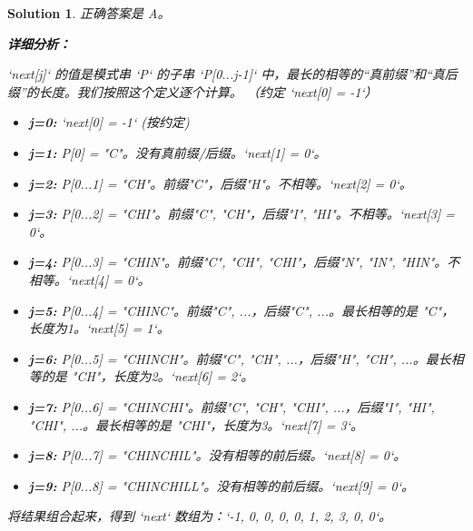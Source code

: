 \documentclass[UTF8]{report}
\newtheorem{solution}{Solution}
\theoremstyle{MyLineTheoremStyle} %
\theoremstyle{MyBlockTheoremStyle} %
\theoremstyle{MySubsubsectionStyle} %
\begin{document}
\begin{solution}
正确答案是 A。

\textbf{详细分析：}

`next[j]` 的值是模式串 `P` 的子串 `P[0...j-1]` 中，最长的相等的“真前缀”和“真后缀”的长度。我们按照这个定义逐个计算。
（约定 `next[0] = -1`）

\begin{itemize}
    \item \textbf{j=0:} `next[0] = -1` (按约定)
    \item \textbf{j=1:} P[0] = "C"。没有真前缀/后缀。`next[1] = 0`。
    \item \textbf{j=2:} P[0...1] = "CH"。前缀{"C"}，后缀{"H"}。不相等。`next[2] = 0`。
    \item \textbf{j=3:} P[0...2] = "CHI"。前缀{"C", "CH"}，后缀{"I", "HI"}。不相等。`next[3] = 0`。
    \item \textbf{j=4:} P[0...3] = "CHIN"。前缀{"C", "CH", "CHI"}，后缀{"N", "IN", "HIN"}。不相等。`next[4] = 0`。
    \item \textbf{j=5:} P[0...4] = "CHINC"。前缀{"C", ...}，后缀{"C", ...}。最长相等的是 "C"，长度为1。`next[5] = 1`。
    \item \textbf{j=6:} P[0...5] = "CHINCH"。前缀{"C", "CH", ...}，后缀{"H", "CH", ...}。最长相等的是 "CH"，长度为2。`next[6] = 2`。
    \item \textbf{j=7:} P[0...6] = "CHINCHI"。前缀{"C", "CH", "CHI", ...}，后缀{"I", "HI", "CHI", ...}。最长相等的是 "CHI"，长度为3。`next[7] = 3`。
    \item \textbf{j=8:} P[0...7] = "CHINCHIL"。没有相等的前后缀。`next[8] = 0`。
    \item \textbf{j=9:} P[0...8] = "CHINCHILL"。没有相等的前后缀。`next[9] = 0`。
\end{itemize}

将结果组合起来，得到 `next` 数组为：`{-1, 0, 0, 0, 0, 1, 2, 3, 0, 0}`。
\end{solution}
\end{document}
